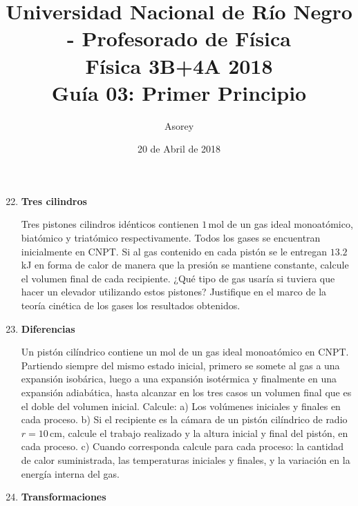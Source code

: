 \documentclass[a4paper,12pt]{article}
\begin{document}
\title{
{\normalsize{Universidad Nacional de Río Negro - Profesorado de Física}}\\
Física 3B+4A  2018 \\ Guía 03: Primer Principio
}
\author{Asorey}
\date{20 de Abril de 2018}
\maketitle

\begin{enumerate}
	\setcounter{enumi}{21}      %

    \item {\bf{Tres cilindros}}

        Tres pistones cilindros idénticos contienen $1$\,mol de un gas ideal 
        monoatómico, biatómico y triatómico respectivamente. Todos los gases se
        encuentran inicialmente en CNPT. Si al gas contenido en cada pistón se
        le entregan $13.2$\,kJ en forma de calor de manera que la presión se
        mantiene constante, calcule el volumen final de cada recipiente.
        ¿Qué tipo de gas usaría si tuviera que hacer un elevador utilizando 
        estos pistones? Justifique en el marco de la teoría cinética de los
        gases los resultados obtenidos.

	\item {\bf{Diferencias}}
		
		Un pistón cilíndrico contiene un mol de un gas ideal monoatómico en
		CNPT.  Partiendo siempre del mismo estado inicial, primero se somete al
		gas a una expansión isobárica, luego a una expansión isotérmica y
		finalmente en una expansión adiabática, hasta alcanzar en los tres
		casos un volumen final que es el doble del volumen inicial. Calcule: a)
		Los volúmenes iniciales y finales en cada proceso. b) Si el recipiente
		es la cámara de un pistón cilíndrico de radio $r=10$\,cm, calcule el
		trabajo realizado y la altura inicial y final del pistón, en cada
		proceso. c) Cuando corresponda calcule para cada proceso: la cantidad
		de calor suministrada, las temperaturas iniciales y finales, y la
		variación en la energía interna del gas.
	
	\item {\bf{Transformaciones}}
		

\end{enumerate}
\end{document}
